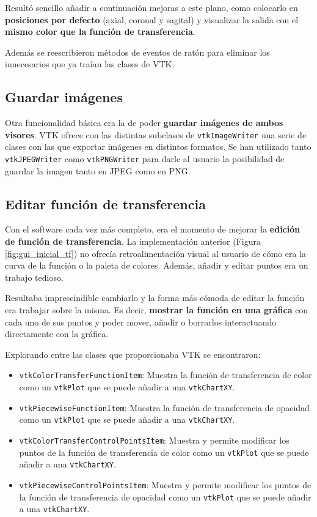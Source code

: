 Resultó sencillo añadir a continuación mejoras a este plano, como colocarlo en \textbf{posiciones por defecto} (axial, coronal y sagital) y visualizar la salida con el \textbf{mismo color que la función de transferencia}.

Además se reescribieron métodos de eventos de ratón para eliminar los innecesarios que ya traían las clases de VTK.

\subsection{Guardar imágenes}

Otra funcionalidad básica era la de poder \textbf{guardar imágenes de ambos visores}. VTK ofrece con las distintas subclases de \texttt{vtkImageWriter} una serie de clases con las que exportar imágenes en distintos formatos. Se han utilizado tanto \texttt{vtkJPEGWriter} como \texttt{vtkPNGWriter} para darle al usuario la posibilidad de guardar la imagen tanto en JPEG como en PNG. 

\subsection{Editar función de transferencia}

Con el software cada vez más completo, era el momento de mejorar la \textbf{edición de función de transferencia}. La implementación anterior (Figura \ref{fig:gui_inicial_tf}) no ofrecía retroalimentación visual al usuario de cómo era la curva de la función o la paleta de colores. Además, añadir y editar puntos era un trabajo tedioso.

Resultaba imprescindible cambiarlo y la forma más cómoda de editar la función era trabajar sobre la misma. Es decir, \textbf{mostrar la función en una gráfica} con cada uno de sus puntos y poder mover, añadir o borrarlos interactuando directamente con la gráfica.

Explorando entre las clases que proporcionaba VTK se encontraron:

\begin{itemize}
	\item \texttt{vtkColorTransferFunctionItem}: Muestra la función de transferencia de color como un \texttt{vtkPlot} que se puede añadir a una \texttt{vtkChartXY}.
	\item \texttt{vtkPiecewiseFunctionItem}: Muestra la función de transferencia de opacidad como un \texttt{vtkPlot} que se puede añadir a una \texttt{vtkChartXY}.
	\item \texttt{vtkColorTransferControlPointsItem}: Muestra y permite modificar los puntos de la función de transferencia de color como un \texttt{vtkPlot} que se puede añadir a una \texttt{vtkChartXY}.
	\item \texttt{vtkPiecewiseControlPointsItem}: Muestra y permite modificar los puntos de la función de transferencia de opacidad como un \texttt{vtkPlot} que se puede añadir a una \texttt{vtkChartXY}.
\end{itemize}

